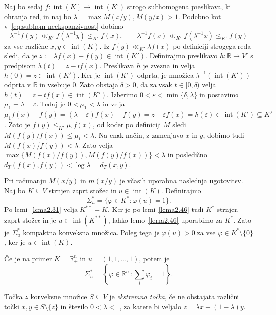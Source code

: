 \documentclass[mat2, tisk]{fmfdelo}
\begin{document}
\begin{dokaz}
  Naj bo sedaj
  $f:\operatorname{int}(K)\longrightarrow\operatorname{int}(K')$
  strogo subhomogena preslikava, ki ohranja red, in naj bo
  $\lambda = \max{M(x/y),M(y/x)} >1$. Podobno kot v~\eqref{eq:subhom-neekspanzivnost} dobimo
  \[
  \lambda^{-1}f(y)
  \ll_{K'}f(\lambda^{-1}y)
  \leq_{K'}f(x),
  \qquad
  \lambda^{-1}f(x)
  \ll_{K'}f(\lambda^{-1}x)
  \leq_{K'}f(y)
  \]
  za vse različne $x,y\in\operatorname{int}(K)$. 
  Iz $f(y)\ll_{K'}\lambda f(x)$ po definiciji strogega reda sledi, da je $z:=\lambda f(x)-f(y)\in\operatorname{int}(K')$. Definirajmo preslikavo $h\colon\mathbb{R}\to V'$ s predpisom $h(t)=z-tf(x)$. Preslikava $h$ je zvezna in velja $h(0)=z\in\operatorname{int}(K')$. Ker je $\operatorname{int}(K')$ odprta, je množica $h^{-1}(\operatorname{int}(K'))$ odprta v $\mathbb{R}$ in vsebuje $0$. Zato obstaja $\delta>0$, da za vsak $t\in[0,\delta)$ velja $h(t)=z-tf(x)\in\operatorname{int}(K')$.
  Izberimo $0<\varepsilon<\min\{\delta,\lambda\}$ in postavimo $\mu_1=\lambda-\varepsilon$. Tedaj je $0<\mu_1<\lambda$ in velja $\mu_1f(x)-f(y)=(\lambda-\varepsilon)f(x)-f(y)=z-\varepsilon f(x)=h(\varepsilon)\in\operatorname{int}(K')\subseteq K'$. Zato je $f(y)\leq_{K'}\mu_1f(x)$, od koder po definiciji $M$ sledi $M(f(y)/f(x))\leq\mu_1<\lambda$.
  Na enak način, z zamenjavo $x$ in $y$,
  dobimo tudi
  $M(f(x)/f(y))<\lambda$.
  Zato velja $\max\{M(f(x)/f(y)),M(f(y)/f(x))\}<\lambda$ in posledično $d_T(f(x),f(y))<\log\lambda=d_T(x,y)$.
\end{dokaz}

Pri računanju $M(x/y)$ in $m(x/y)$ je včasih uporabna naslednja
ugotovitev. Naj bo $K\subseteq V$ strnjen zaprt stožec in
$u\in\operatorname{int}(K)$. Definirajmo
\[
\Sigma_u^*=\{\varphi\in K^*:\varphi(u)=1\}.
\]
Po lemi~\ref{lema2.31} velja $K^{**}=K$.
Ker je po lemi~\ref{lema2.46} tudi $K^*$ strnjen
zaprt stožec in je $u\in\operatorname{int}(K^{**})$,
lahko lemo~\ref{lema2.46} uporabimo za $K^*$.
Zato je $\Sigma_u^*$ kompaktna konveksna množica.
Poleg tega je $\varphi(u)>0$ za vse
$\varphi\in K^*\setminus\{0\}$, ker je $u\in\operatorname{int}(K)$.

Če je na primer $K=\mathbb{R}_+^n$ in $u=(1,1, \ldots, 1)$, potem je
\[
\Sigma_u^*
=
\left\{
\varphi\in\mathbb{R}_+^n:
\sum_i\varphi_i=1
\right\}.
\]

\begin{definicija}
Točka $z$ konveksne množice $S\subseteq V$ je \emph{ekstremna točka},
če ne obstajata različni točki $x,y\in S\setminus\{z\}$ in število
$0<\lambda<1$, za katere bi veljalo
$z=\lambda x+(1-\lambda)y$.
\end{definicija}
\end{document}
